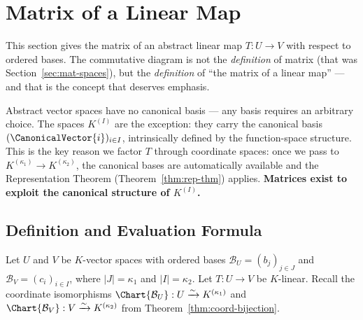 
\newpage
\section{Matrix of a Linear Map}
\label{sec:matrix-of-map}

This section gives the matrix of an abstract linear map $T: U \to V$ with respect to
ordered bases. The commutative diagram is not the \emph{definition} of matrix
(that was Section~\ref{sec:mat-spaces}), but the \emph{definition} of ``the matrix of a
linear map'' --- and that is the concept that deserves emphasis.

\begin{remark}[{Why $K^{(I)}$?}]
    Abstract vector spaces have no canonical basis --- any basis requires an arbitrary choice.
    The spaces $K^{(I)}$ are the exception: they carry the canonical basis $(\CanonicalVector{i})_{i \in I}$,
    intrinsically defined by the function-space structure. This is the key reason we factor $T$
    through coordinate spaces: once we pass to $K^{(\kappa_1)} \to K^{(\kappa_2)}$, the
    canonical bases are automatically available and the Representation Theorem
    (Theorem~\ref{thm:rep-thm}) applies.
    \textbf{Matrices exist to exploit the canonical structure of $K^{(I)}$.}
\end{remark}

\subsection{Definition and Evaluation Formula}

Let $U$ and $V$ be $K$-vector spaces with ordered bases $\mathcal{B}_U = (b_j)_{j \in J}$ and
$\mathcal{B}_V = (c_i)_{i \in I}$, where $|J| = \kappa_1$ and $|I| = \kappa_2$.
Let $T: U \to V$ be $K$-linear. Recall the coordinate isomorphisms
$\Chart{\mathcal{B}_U}: U \xrightarrow{\sim} K^{(\kappa_1)}$ and
$\Chart{\mathcal{B}_V}: V \xrightarrow{\sim} K^{(\kappa_2)}$ from Theorem~\ref{thm:coord-bijection}.

